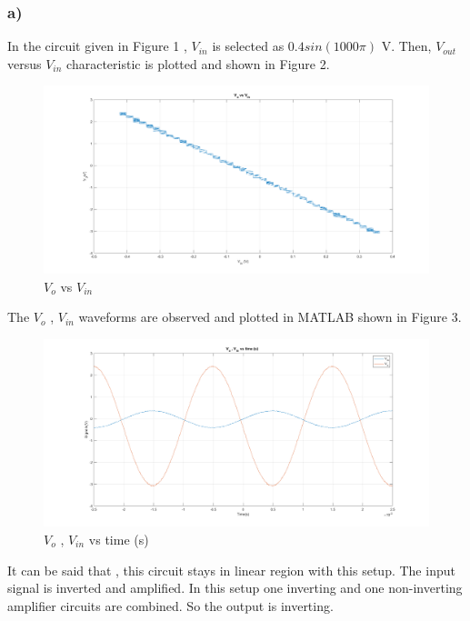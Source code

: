 \documentclass[letterpaper,12pt]{article}
\begin{document}
\subsubsection{a)}
In the circuit given in Figure 1 , \(V_{in}\) is selected as \(0.4sin(1000\pi)\) V. Then, \(V_{out}\) versus \(V_{in}\) characteristic is plotted and shown in Figure 2. 

\begin{figure}[H]
	\centering
   \includegraphics[width=1\textwidth]{1a_1.png}
   \caption{\(V_{o}\) vs \(V_{in}\)}
\end{figure}
The \(V_o\) , \(V_{in}\) waveforms are observed and plotted in MATLAB shown in Figure 3.
\begin{figure}[H]
	\centering
   \includegraphics[width=1\textwidth]{1a_2.png}
   \caption{\(V_{o}\) , \(V_{in}\) vs time (s) }
\end{figure}
It can be said that , this circuit stays in linear region with this setup. The input signal is inverted and amplified. In this setup one inverting and one non-inverting amplifier circuits are combined. So the output is inverting. 
\end{document}

